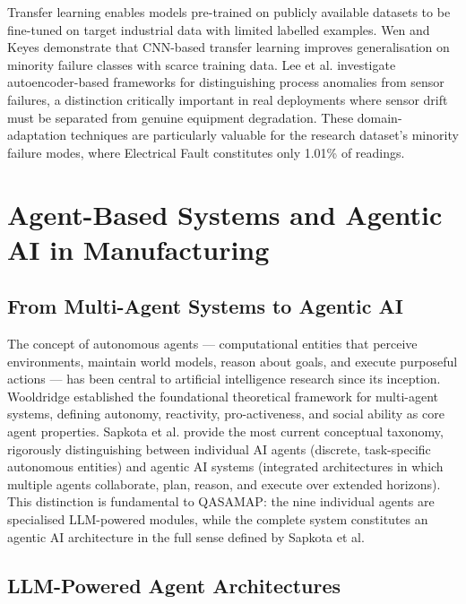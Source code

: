 Transfer learning enables models pre-trained on publicly available datasets to be fine-tuned on target industrial data with limited labelled examples. Wen and Keyes \cite{wen_time_2019} demonstrate that CNN-based transfer learning improves generalisation on minority failure classes with scarce training data. Lee et al. \cite{lee_autoencoder-based_2024} investigate autoencoder-based frameworks for distinguishing process anomalies from sensor failures, a distinction critically important in real deployments where sensor drift must be separated from genuine equipment degradation. These domain-adaptation techniques are particularly valuable for the research dataset's minority failure modes, where Electrical Fault constitutes only 1.01\% of readings.

\section{Agent-Based Systems and Agentic AI in Manufacturing}



\subsection{From Multi-Agent Systems to Agentic AI}

The concept of autonomous agents --- computational entities that perceive environments, maintain world models, reason about goals, and execute purposeful actions --- has been central to artificial intelligence research since its inception. Wooldridge \cite{Wooldridge1995} established the foundational theoretical framework for multi-agent systems, defining autonomy, reactivity, pro-activeness, and social ability as core agent properties. Sapkota et al. \cite{sapkota_ai_2026} provide the most current conceptual taxonomy, rigorously distinguishing between individual AI agents (discrete, task-specific autonomous entities) and agentic AI systems (integrated architectures in which multiple agents collaborate, plan, reason, and execute over extended horizons). This distinction is fundamental to QASAMAP: the nine individual agents are specialised LLM-powered modules, while the complete system constitutes an agentic AI architecture in the full sense defined by Sapkota et al.

\subsection{LLM-Powered Agent Architectures}

